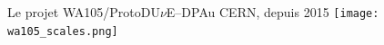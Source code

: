 
    \begin{frame}{Le projet WA105/ProtoDU$\nu$E--DP}{Au CERN, depuis 2015}
        \centering
       	\vspace{-0.5cm}\hspace{-0.4cm}\texttt{[image: wa105\_scales.png]}
    \end{frame}
        

